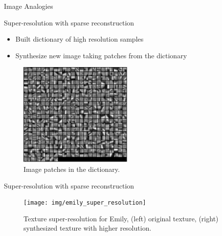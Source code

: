 \documentclass{beamer}
\begin{document}
\begin{frame}{Image Analogies}
\end{frame}


\begin{frame}{Super-resolution with sparse reconstruction}

\begin{itemize}
\setlength\itemsep{0.5em}
\item Built dictionary of high resolution samples
\item Synthesize new image taking patches from the dictionary
\end{itemize}

\begin{figure}
        \centering
        \includegraphics[width=0.5\textwidth]{img/superres_dic}
        \caption{Image patches in the dictionary.}
\end{figure}

\end{frame}

\begin{frame}{Super-resolution with sparse reconstruction}

\begin{figure}
        \centering
        \texttt{[image: img/emily\_super\_resolution]}
        \caption{Texture super-resolution for Emily, (left) original texture, (right) synthesized texture with higher resolution.}
\end{figure}
\end{frame}

\end{document}
